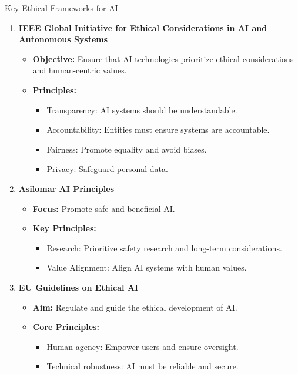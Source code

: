 \documentclass[aspectratio=169]{beamer}
\begin{document}
\begin{frame}[fragile]{Key Ethical Frameworks for AI}
    \begin{enumerate}
        \item \textbf{IEEE Global Initiative for Ethical Considerations in AI and Autonomous Systems}
            \begin{itemize}
                \item \textbf{Objective:} Ensure that AI technologies prioritize ethical considerations and human-centric values.
                \item \textbf{Principles:}
                    \begin{itemize}
                        \item Transparency: AI systems should be understandable.
                        \item Accountability: Entities must ensure systems are accountable.
                        \item Fairness: Promote equality and avoid biases.
                        \item Privacy: Safeguard personal data.
                    \end{itemize}
            \end{itemize}
        
        \item \textbf{Asilomar AI Principles}
            \begin{itemize}
                \item \textbf{Focus:} Promote safe and beneficial AI.
                \item \textbf{Key Principles:}
                    \begin{itemize}
                        \item Research: Prioritize safety research and long-term considerations.
                        \item Value Alignment: Align AI systems with human values.
                    \end{itemize}
            \end{itemize}

        \item \textbf{EU Guidelines on Ethical AI}
            \begin{itemize}
                \item \textbf{Aim:} Regulate and guide the ethical development of AI.
                \item \textbf{Core Principles:}
                    \begin{itemize}
                        \item Human agency: Empower users and ensure oversight.
                        \item Technical robustness: AI must be reliable and secure.
                    \end{itemize}
            \end{itemize}
    \end{enumerate}
\end{frame}
\end{document}
